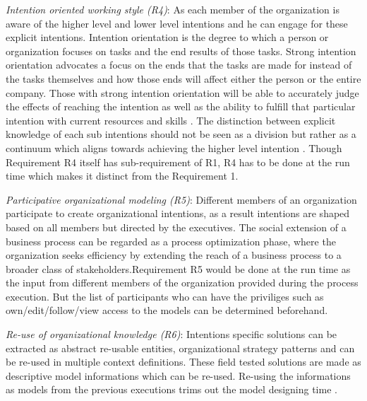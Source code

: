 \textit{Intention oriented working style (R4)}: As each member of the organization is aware of the higher level and lower level intentions and he can engage for these explicit intentions. Intention orientation is the degree to which a person or organization focuses on tasks and the end results of those tasks. Strong intention orientation advocates a focus on the ends that the tasks are made for instead of the tasks themselves and how those ends will affect either the person or the entire company. Those with strong intention orientation will be able to accurately judge the effects of reaching the intention as well as the ability to fulfill that particular intention with current resources and skills \cite{Lacom}. The distinction between explicit knowledge of each sub intentions should not be seen as a division but rather as a continuum which aligns towards achieving the higher level intention . Though Requirement R4 itself has sub-requirement of R1, R4 has to be done at the run time which makes it distinct from the Requirement 1.

 \textit{Participative organizational modeling (R5)}: Different members of an organization participate to create organizational intentions, as a result intentions are shaped based on all members but directed by the executives. The  social  extension  of  a  business  process  can  be  regarded  as  a  process optimization phase, where the organization seeks efficiency  by  extending  the  reach  of  a  business  process  to  a  broader  class  of  stakeholders\cite{Brambilla2012}.Requirement R5 would be done at the run time as the input from different members of the organization provided during the process execution. But the list of participants who can have the priviliges such as own/edit/follow/view access to the models can be determined beforehand.
 
 \textit{Re-use of organizational knowledge (R6)}: Intentions specific solutions can be extracted as abstract re-usable entities, organizational strategy patterns and can be re-used in multiple context definitions. These field tested solutions are made as descriptive model informations which can be re-used.  Re-using the informations as models from the previous executions trims out the model designing time \cite{Yu2000}.


